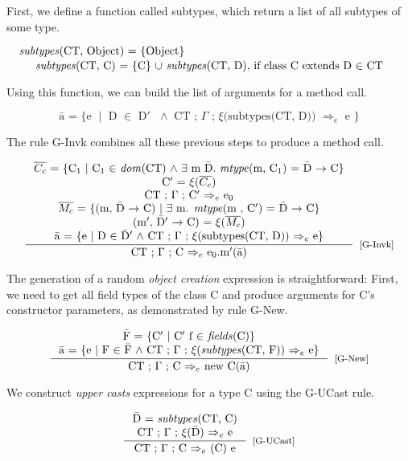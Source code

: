 \documentclass[tese,capa,english]{texufpel}
\begin{document}
First, we define a function called subtypes, which return a list of all subtypes
of some type.

\[
\stackanchor{\textrm{\emph{subtypes}(CT, Object) = \{Object\}} \hspace{188pt}}
            {\textrm{\emph{subtypes}(CT, C) = \{C\} $\cup$ \emph{subtypes}(CT, D), if class C extends D $\in$ CT}}
\]

Using this function, we can build the list of arguments for a method call.

\[
\textrm{\={a} = \{e $\mid$ D $\in$ \={D}$'$ $\land$ CT ; $\Gamma$ ; $\xi$(subtypes(CT, D)) $\Rightarrow_e$ e \}}
\]

The rule {\footnotesize G-Invk} combines all these previous steps to produce a method call.
    
\[
\inference{\textrm{$\overline{C_c}$ = \{C$_1$ $\mid$ C$_1$ $\in$ \emph{dom}(CT) $\land$ $\exists$ m \={D}. \emph{mtype}(m, C$_1$) = \={D} $->$ C\}} \\
           \textrm{C$'$ = $\xi$($\overline{C_c}$)} \\
           \textrm{CT ; $\Gamma$ ; C$'$ $\Rightarrow_e$ e$_0$} \\
           \textrm{$\overline{M_c}$ = \{(m, \={D} $->$ C) $\mid$ $\exists$ m. \emph{mtype}(m , C$'$) = \={D} $->$ C\}} \\
           \textrm{(m$'$, \={D}$'$ $->$ C) = $\xi$($\overline{M_c}$)} \\
           \textrm{\={a} = \{e $\mid$ D $\in$ \={D}$'$ $\land$ CT ; $\Gamma$ ; $\xi$(subtypes(CT, D)) $\Rightarrow_e$ e\}}}
          {\textrm{CT ; $\Gamma$ ; C $\Rightarrow_e$ e$_0$.m$'$(\={a})}}[\footnotesize{[G-Invk]}]
\]

The generation of a random \emph{object creation} expression is straightforward: First, we need to get all field types of the class C and produce arguments for C's constructor parameters, as demonstrated by rule {\footnotesize G-New}.

\[
\inference{\textrm{\={F} = \{C$'$ $\mid$ C$'$ f $\in$ \emph{fields}(C)\}} \\
           \textrm{\={a} = \{e $\mid$ F $\in$ \={F} $\land$ CT ; $\Gamma$ ; $\xi$(\emph{subtypes}(CT, F)) $\Rightarrow_e$ e\}}}
          {\textrm{CT ; $\Gamma$ ; C $\Rightarrow_e$ new C(\={a})}}[\footnotesize{[G-New]}]
\]

We construct \emph{upper casts} expressions for a type C using
the {\footnotesize G-UCast} rule.

\[
\inference{\textrm{\={D} = \emph{subtypes}(CT, C)} \\
           \textrm{CT ; $\Gamma$ ; $\xi$(\={D}) $\Rightarrow_e$ e}}
          {\textrm{CT ; $\Gamma$ ; C $\Rightarrow_e$ (C) e}}[\footnotesize{[G-UCast]}]
\]
\end{document}
